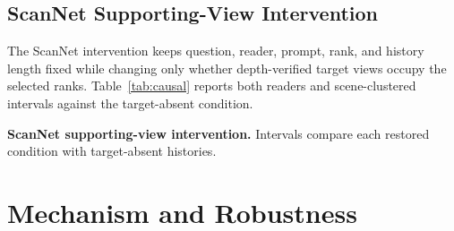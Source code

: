 \documentclass{article}
\begin{document}
\subsection{ScanNet Supporting-View Intervention}
The ScanNet intervention keeps question, reader, prompt, rank, and history length fixed while changing only whether depth-verified target views occupy the selected ranks. Table~\ref{tab:causal} reports both readers and scene-clustered intervals against the target-absent condition.

\begin{table}[H]
  \centering
  \caption{\textbf{ScanNet supporting-view intervention.} Intervals compare each restored condition with target-absent histories.}
  \label{tab:causal}
  \begin{adjustbox}{max width=\columnwidth,max height=0.35\textheight}
    
  \end{adjustbox}
\end{table}



\section{Mechanism and Robustness}
\end{document}
